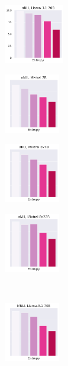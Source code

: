 \begin{figure}[t]
    \centering
    \begin{subfigure}[b]{0.2\textwidth}
        \includegraphics[height=2.6cm]{figures/appendix/entropy_acc_abductivenli_70B}
        \caption{}
    \end{subfigure}
    \begin{subfigure}[b]{0.2\textwidth}
        \includegraphics[height=2.6cm]{figures/appendix/entropy_acc_abductivenli_7B}
        \caption{}
    \end{subfigure}
    \begin{subfigure}[b]{0.2\textwidth}
        \includegraphics[height=2.6cm]{figures/appendix/entropy_acc_abductivenli_8x7B}
        \caption{}
    \end{subfigure}
    \begin{subfigure}[b]{0.2\textwidth}
        \includegraphics[height=2.6cm]{figures/appendix/entropy_acc_abductivenli_8x22B}
        \caption{}
    \end{subfigure}\\
    \begin{subfigure}[b]{0.2\textwidth}
        \includegraphics[height=2.6cm]{figures/appendix/entropy_acc_mnli_matched_70B}

\end{subfigure}
\end{figure}
